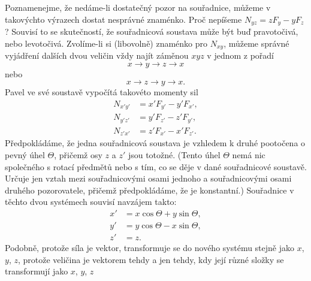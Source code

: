     Poznamenejme, že nedáme-li dostatečný pozor na souřadnice, můžeme v takovýchto výrazech dostat
    nesprávné znaménko. Proč nepíšeme \(N_{yz} = zF_y - yF_z\)? Souvisí to se skutečností, že
    souřadnicová soustava může být buď pravotočivá, nebo levotočivá. Zvolíme-li si (libovolně)
    znaménko pro \(N_{xy}\), můžeme správné vyjádření dalších dvou veličin vždy najít záměnou
    \(xyz\) v jednom z pořadí
    \begin{equation*}
      x \rightarrow y \rightarrow z \rightarrow x
    \end{equation*}
    nebo
    \begin{equation*}
      x \rightarrow z \rightarrow y \rightarrow x.
    \end{equation*}
    Pavel ve své soustavě vypočítá takovéto momenty sil
    \begin{subequations}\label{fyz:eq711}
      \begin{align}
        N_{x'y'} &=  x'F_{y'} - y'F_{x'}, \label{fyz:eq711a}  \\
        N_{y'z'} &=  y'F_{z'} - z'F_{y'}, \label{fyz:eq711b}  \\
        N_{z'x'} &=  z'F_{x'} - x'F_{z'}. \label{fyz:eq711c}        
      \end{align}
    \end{subequations} 
    Předpokládáme, že jedna souřadnicová soustava je vzhledem k druhé pootočena o pevný úhel
    \(\Theta\), přičemž osy \(z\) a \(z'\) jsou totožné. (Tento úhel \(\Theta\) nemá nic společného
    s rotací předmětů nebo s tím, co se děje v dané souřadnicové soustavě. Určuje jen vztah mezi
    souřadnicovými osami jednoho a souřadnicovými osami druhého pozorovatele, přičemž předpokládáme,
    že je konstantní.) Souřadnice v těchto dvou systémech souvisí navzájem takto:
    \begin{subequations}\label{fyz:eq712}
      \begin{align}
        x' &=  x\cos\Theta + y\sin\Theta, \label{fyz:eq712a}  \\
        y' &=  y\cos\Theta - x\sin\Theta, \label{fyz:eq712b}  \\
        z' &=  z.                         \label{fyz:eq712c}        
      \end{align}
    \end{subequations} 
    Podobně, protože síla je vektor, transformuje se do nového systému stejně jako \(x\), \(y\),
    \(z\), protože veličina je vektorem tehdy a jen tehdy, kdy její různé složky se transformují
    jako \(x\), \(y\), \(z\)
